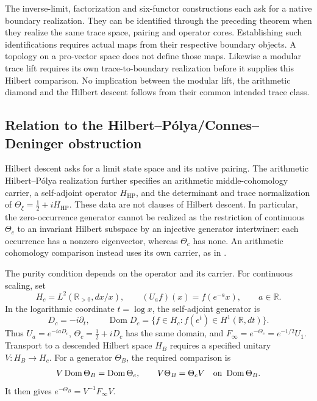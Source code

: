 \begin{remark}
\label{v4-arith:w10-a:rem:aliases}
The inverse-limit, factorization and six-functor constructions each
ask for a native boundary realization. They can be identified through
the preceding theorem when they realize the same trace space,
pairing and operator cores. Establishing such identifications
requires actual maps from their respective boundary objects.
A topology on a pro-vector space does not define those maps.
Likewise a modular trace lift requires its own trace-to-boundary
realization before it supplies this Hilbert comparison.
No implication between the modular lift, the arithmetic diamond and
the Hilbert descent follows from their common intended trace class.
\end{remark}
\subsection{Relation to the Hilbert--P\'olya/Connes--Deninger obstruction}
\label{v4-arith:w10-a:HP-relation}

\begin{remark}
\label{v4-arith:w10-a:rem:weaker-than-RH}
Hilbert descent asks for a limit state space and its native pairing.
The arithmetic Hilbert--P\'olya realization further specifies an
arithmetic middle-cohomology carrier, a self-adjoint operator
\(H_{\mathrm{HP}}\), and the determinant and trace normalization of
\(\Theta_\xi=\tfrac12+iH_{\mathrm{HP}}\).
These data are not clauses of Hilbert descent.
In particular, the zero-occurrence generator cannot be realized as
the restriction of continuous \(\Theta_c\) to an invariant Hilbert
subspace by an injective generator intertwiner: each occurrence has
a nonzero eigenvector, whereas \(\Theta_c\) has none.
An arithmetic cohomology comparison instead uses its own carrier,
as in .
\end{remark}

The purity condition depends on the operator and its carrier.
For continuous scaling, set
\[
 H_c=L^2(\mathbb R_{>0},dx/x),\qquad
 (U_a f)(x)=f(e^{-a}x),\qquad a\in\mathbb R.
\]
In the logarithmic coordinate \(t=\log x\), the self-adjoint generator is
\[
 D_c=-i\partial_t,\qquad
 \operatorname{Dom}D_c=\{f\in H_c:f(e^t)\in H^1(\mathbb R,dt)\}.
\]
Thus \(U_a=e^{-iaD_c}\),
\(\Theta_c=\tfrac12+iD_c\) has the same domain, and
\(F_\infty=e^{-\Theta_c}=e^{-1/2}U_1\).
Transport to a descended Hilbert space \(H_B\) requires a specified
unitary \(V:H_B\to H_c\). For a generator \(\Theta_B\), the required
comparison is
\[
 V\operatorname{Dom}\Theta_B=\operatorname{Dom}\Theta_c,
 \qquad V\Theta_B=\Theta_c V
 \quad\hbox{on }\operatorname{Dom}\Theta_B.
\]
It then gives \(e^{-\Theta_B}=V^{-1}F_\infty V\).

